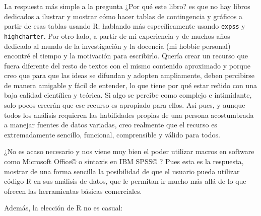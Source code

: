\documentclass[
]{book}
\begin{document}
La respuesta más simple a la pregunta ¿Por qué este libro? es que no hay libros dedicados a ilustrar y mostrar cómo hacer tablas de contingencia y gráficos a partir de esas tablas usando R; hablando más específicamente usando \texttt{expss} y \texttt{highcharter}. Por otro lado, a partir de mi experiencia y de muchos años dedicado al mundo de la investigación y la docencia (mi hobbie personal) encontré el tiempo y la motivación para escribirlo. Quería crear un recurso que fuera diferente del resto de textos con el mismo contenido aproximado y porque creo que para que las ideas se difundan y adopten ampliamente, deben percibirse de manera amigable y fácil de entender, lo que tiene por qué estar reñido con una baja calidad científica y teórica. Si algo se percibe como complejo e intimidante, solo pocos creerán que ese recurso es apropiado para ellos. Así pues, y aunque todos los análisis requieren las habilidades propias de una persona acostumbrada a manejar fuentes de datos variadas, creo realmente que el recurso es extremadamente sencillo, funcional, comprensible y válido para todos.

¿No es acaso necesario y nos viene muy bien el poder utilizar macros en software como Microsoft Office© o sintaxis en IBM SPSS© ? Pues esta es la respuesta, mostrar de una forma sencilla la posibilidad de que el usuario pueda utilizar código R \citep{R-base} en sus análisis de datos, que le permitan ir mucho más allá de lo que ofrecen las herramientas básicas comerciales.

Además, la elección de R no es casual:
\end{document}
